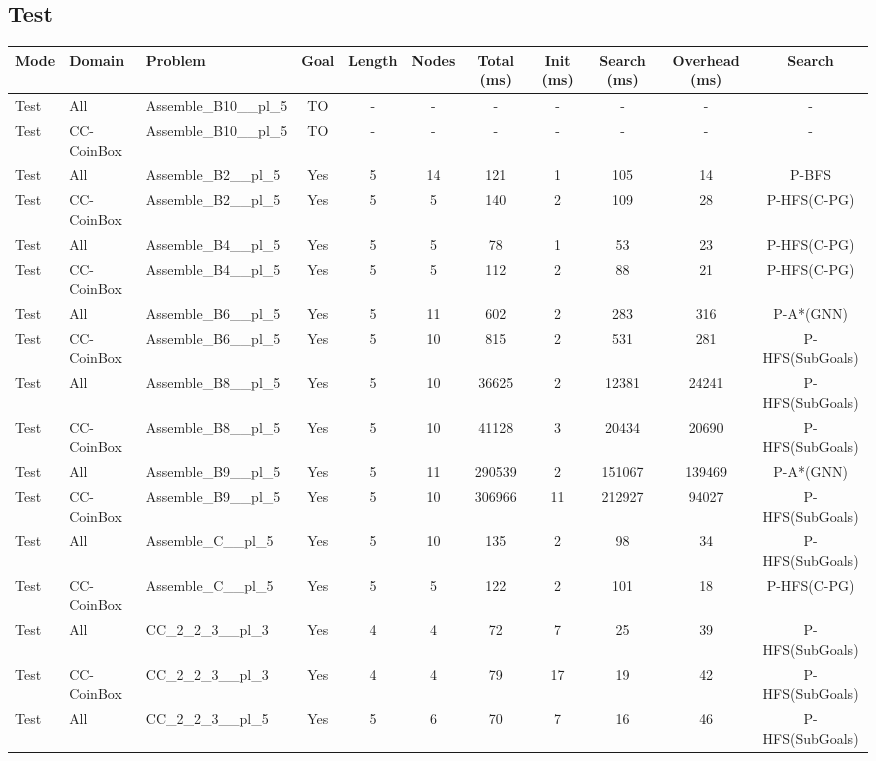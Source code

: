 \documentclass{article}
\begin{document}
\subsection*{Test}
\begin{tabular}{lllcccccccc}
\toprule
Mode & Domain & Problem & Goal & Length & Nodes & Total (ms) & Init (ms) & Search (ms) & Overhead (ms) & Search \\
\midrule
Test & All & Assemble\_B10\_\_pl\_5 & TO & - & - & - & - & - & - & - \\
Test & CC-CoinBox & Assemble\_B10\_\_pl\_5 & TO & - & - & - & - & - & - & - \\
Test & All & Assemble\_B2\_\_pl\_5 & Yes & 5 & 14 & 121 & 1 & 105 & 14 & P-BFS \\
Test & CC-CoinBox & Assemble\_B2\_\_pl\_5 & Yes & 5 & 5 & 140 & 2 & 109 & 28 & P-HFS(C-PG) \\
Test & All & Assemble\_B4\_\_pl\_5 & Yes & 5 & 5 & 78 & 1 & 53 & 23 & P-HFS(C-PG) \\
Test & CC-CoinBox & Assemble\_B4\_\_pl\_5 & Yes & 5 & 5 & 112 & 2 & 88 & 21 & P-HFS(C-PG) \\
Test & All & Assemble\_B6\_\_pl\_5 & Yes & 5 & 11 & 602 & 2 & 283 & 316 & P-A*(GNN) \\
Test & CC-CoinBox & Assemble\_B6\_\_pl\_5 & Yes & 5 & 10 & 815 & 2 & 531 & 281 & P-HFS(SubGoals) \\
Test & All & Assemble\_B8\_\_pl\_5 & Yes & 5 & 10 & 36625 & 2 & 12381 & 24241 & P-HFS(SubGoals) \\
Test & CC-CoinBox & Assemble\_B8\_\_pl\_5 & Yes & 5 & 10 & 41128 & 3 & 20434 & 20690 & P-HFS(SubGoals) \\
Test & All & Assemble\_B9\_\_pl\_5 & Yes & 5 & 11 & 290539 & 2 & 151067 & 139469 & P-A*(GNN) \\
Test & CC-CoinBox & Assemble\_B9\_\_pl\_5 & Yes & 5 & 10 & 306966 & 11 & 212927 & 94027 & P-HFS(SubGoals) \\
Test & All & Assemble\_C\_\_pl\_5 & Yes & 5 & 10 & 135 & 2 & 98 & 34 & P-HFS(SubGoals) \\
Test & CC-CoinBox & Assemble\_C\_\_pl\_5 & Yes & 5 & 5 & 122 & 2 & 101 & 18 & P-HFS(C-PG) \\
Test & All & CC\_2\_2\_3\_\_pl\_3 & Yes & 4 & 4 & 72 & 7 & 25 & 39 & P-HFS(SubGoals) \\
Test & CC-CoinBox & CC\_2\_2\_3\_\_pl\_3 & Yes & 4 & 4 & 79 & 17 & 19 & 42 & P-HFS(SubGoals) \\
Test & All & CC\_2\_2\_3\_\_pl\_5 & Yes & 5 & 6 & 70 & 7 & 16 & 46 & P-HFS(SubGoals) \\

\end{tabular}
\end{document}

